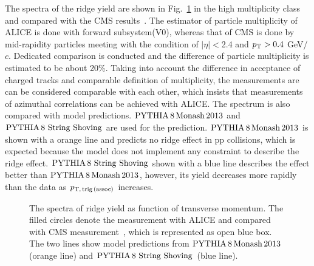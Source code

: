 The spectra of the ridge yield are shown in Fig.~\ref{fig:PlotYSpect} in the high multiplicity class and compared with the CMS results~\cite{Khachatryan:2015lva}. The estimator of particle multiplicity of ALICE is done with forward subsystem(V0), whereas that of CMS is done by mid-rapidity particles meeting with the condition of $|\eta|<$2.4 and $p_\mathrm{T}>0.4$ GeV/$c$. Dedicated comparison is conducted and the difference of particle multiplicity is estimated to be about 20\%. Taking into account the difference in acceptance of charged tracks and comparable definition of multiplicity, the measurements are can be considered comparable with each other, which insists that measurements of azimuthal correlations can be achieved with ALICE. The spectrum is also compared with model predictions. $\mathrm{PYTHIA}\,8\,\mathrm{Monash}\,2013$ and $\mathrm{PYTHIA}\,8~\mathrm{String}~\mathrm{Shoving}$ are used for the prediction. $\mathrm{PYTHIA}\,8\,\mathrm{Monash}\,2013$ is shown with a orange line and predicts no ridge effect in pp collisions, which is expected because the model does not implement any constraint to describe the ridge effect. $\mathrm{PYTHIA}\,8~\mathrm{String}~\mathrm{Shoving}$ shown with a blue line describes the effect better than $\mathrm{PYTHIA}\,8\,\mathrm{Monash}\,2013$, however, its yield decreases more rapidly than the data as $p_\mathrm{T,\,trig\,(assoc)}$ increases.

\begin{figure}[h!]
	\centering
	\caption{ The spectra of ridge yield as function of transverse momentum. The filled circles denote the measurement with ALICE and compared with CMS measurement~\cite{Khachatryan:2015lva}, which is represented as open blue box. The two lines show model predictions from $\mathrm{PYTHIA}\,8\,\mathrm{Monash}\,2013$ (orange line) and $\mathrm{PYTHIA}\,8~\mathrm{String}~\mathrm{Shoving}$ (blue line). }
	\label{fig:PlotYSpect}
\end{figure}


